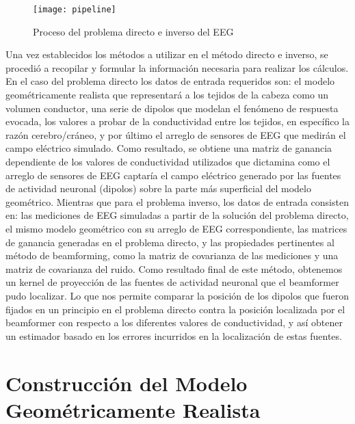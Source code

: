 \begin{figure}[htb]
	\texttt{[image: pipeline]}
	\caption{Proceso del problema directo e inverso del EEG}
	\label{fig:methodology:pipeline}
\end{figure}


Una vez establecidos los métodos a utilizar en el método directo e inverso, se procedió a recopilar y formular la información necesaria para realizar los cálculos. En el caso del problema directo los datos de entrada requeridos son: el modelo geométricamente realista que representará a los tejidos de la cabeza como un volumen conductor, una serie de dipolos que modelan el fenómeno de respuesta evocada, los valores a probar de la conductividad entre los tejidos, en específico la razón cerebro/cráneo, y por último el arreglo de sensores de EEG que medirán el campo eléctrico simulado. Como resultado, se obtiene una matriz de ganancia dependiente de los valores de conductividad utilizados que dictamina como el arreglo de sensores de EEG captaría el campo eléctrico generado por las fuentes de actividad neuronal (dipolos) sobre la parte más superficial del modelo geométrico. Mientras que para el problema inverso, los datos de entrada consisten en: las mediciones de EEG simuladas a partir de la solución del problema directo, el mismo modelo geométrico con su arreglo de EEG correspondiente, las matrices de ganancia generadas en el problema directo, y las propiedades pertinentes al método de beamforming, como la matriz de covarianza de las mediciones y una matriz de covarianza del ruido. Como resultado final de este método, obtenemos un kernel de proyección de las fuentes de actividad neuronal que el beamformer pudo localizar. Lo que nos permite comparar la posición de los dipolos que fueron fijados en un principio en el problema directo contra la posición localizada por el beamformer con respecto a los diferentes valores de conductividad, y así obtener un estimador basado en los errores incurridos en la localización de estas fuentes. 


\section{Construcción del Modelo Geométricamente Realista}
\label{sec:methodology:model}


